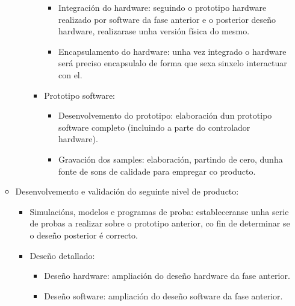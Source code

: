 \begin{enumerate}
\begin{itemize}
\begin{itemize}
\begin{itemize}
\begin{itemize}
                             \item Integración do hardware: seguindo o
                                   prototipo hardware realizado por software da
                                   fase anterior e o posterior deseño hardware,
                                   realizarase unha versión física do mesmo.
                             \item Encapsulamento do hardware: unha vez
                                   integrado o hardware será preciso
                                   encapsulalo de forma que sexa sinxelo
                                   interactuar con el.
                            \end{itemize}
                      \item Prototipo software:
                            \begin{itemize}
                             \item Desenvolvemento do prototipo: elaboración
                                   dun prototipo software completo (incluindo a
                                   parte do controlador hardware).
                             \item Gravación dos samples: elaboración, partindo
                                   de cero, dunha fonte de sons de calidade
                                   para empregar co producto.
                            \end{itemize}
                     \end{itemize}
              \end{itemize}
        \item Desenvolvemento e validación do seguinte nivel de producto:
              \begin{itemize}
               \item Simulacións, modelos e programas de proba: estableceranse
                     unha serie de probas a realizar sobre o prototipo
                     anterior, co fin de determinar se o deseño posterior é
                     correcto.
               \item Deseño detallado:
                     \begin{itemize}
                      \item Deseño hardware: ampliación do deseño hardware da
                            fase anterior.
                      \item Deseño software: ampliación do deseño software da
                            fase anterior.

\end{itemize}
\end{itemize}
\end{itemize}
\end{enumerate}
